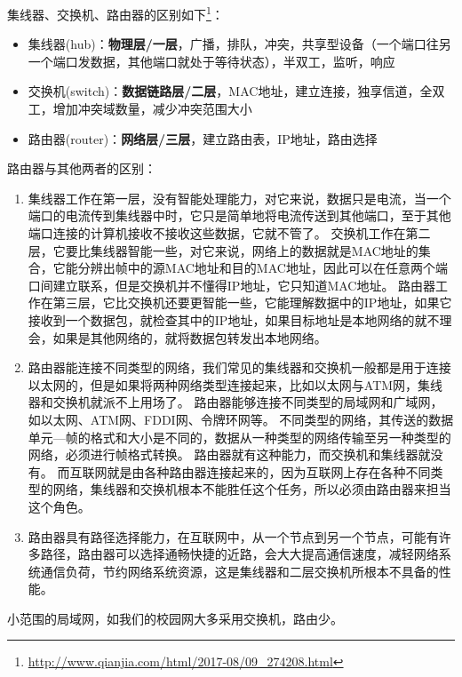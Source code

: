 
集线器、交换机、路由器的区别如下\footnote{\url{http://www.qianjia.com/html/2017-08/09_274208.html}}：
\begin{itemize}
	\item 集线器(hub)：\textbf{物理层/一层}，广播，排队，冲突，共享型设备（一个端口往另一个端口发数据，其他端口就处于等待状态），半双工，监听，响应
	\item 交换机(switch)：\textbf{数据链路层/二层}，MAC地址，建立连接，独享信道，全双工，增加冲突域数量，减少冲突范围大小
	\item 路由器(router)：\textbf{网络层/三层}，建立路由表，IP地址，路由选择
\end{itemize}

路由器与其他两者的区别：
\begin{enumerate}
\item 集线器工作在第一层，没有智能处理能力，对它来说，数据只是电流，当一个端口的电流传到集线器中时，它只是简单地将电流传送到其他端口，至于其他端口连接的计算机接收不接收这些数据，它就不管了。
交换机工作在第二层，它要比集线器智能一些，对它来说，网络上的数据就是MAC地址的集合，它能分辨出帧中的源MAC地址和目的MAC地址，因此可以在任意两个端口间建立联系，但是交换机并不懂得IP地址，它只知道MAC地址。
路由器工作在第三层，它比交换机还要更智能一些，它能理解数据中的IP地址，如果它接收到一个数据包，就检查其中的IP地址，如果目标地址是本地网络的就不理会，如果是其他网络的，就将数据包转发出本地网络。

\item 路由器能连接不同类型的网络，我们常见的集线器和交换机一般都是用于连接以太网的，但是如果将两种网络类型连接起来，比如以太网与ATM网，集线器和交换机就派不上用场了。
路由器能够连接不同类型的局域网和广域网，如以太网、ATM网、FDDI网、令牌环网等。
不同类型的网络，其传送的数据单元---帧的格式和大小是不同的，数据从一种类型的网络传输至另一种类型的网络，必须进行帧格式转换。
路由器就有这种能力，而交换机和集线器就没有。
而互联网就是由各种路由器连接起来的，因为互联网上存在各种不同类型的网络，集线器和交换机根本不能胜任这个任务，所以必须由路由器来担当这个角色。

\item 路由器具有路径选择能力，在互联网中，从一个节点到另一个节点，可能有许多路径，路由器可以选择通畅快捷的近路，会大大提高通信速度，减轻网络系统通信负荷，节约网络系统资源，这是集线器和二层交换机所根本不具备的性能。
\end{enumerate}

小范围的局域网，如我们的校园网大多采用交换机，路由少。